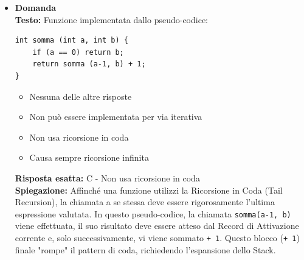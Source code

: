 \documentclass[12pt, a4paper]{article}
\newcounter{domandateoria}
\begin{document}
\begin{itemize}
    \item {}\textbf{Domanda \thedomandateoria} \\
    \textbf{Testo:} Funzione implementata dallo pseudo-codice:
\begin{verbatim}
int somma (int a, int b) {
    if (a == 0) return b;
    return somma (a-1, b) + 1;
}
\end{verbatim}
    \begin{itemize}
        \item[A)] Nessuna delle altre risposte
        \item[B)] Non può essere implementata per via iterativa
        \item[C)] Non usa ricorsione in coda
        \item[D)] Causa sempre ricorsione infinita
    \end{itemize}
    \textbf{Risposta esatta:} C - Non usa ricorsione in coda \\
    \textbf{Spiegazione:} Affinché una funzione utilizzi la Ricorsione in Coda (Tail Recursion), la chiamata a se stessa deve essere rigorosamente l'ultima espressione valutata. In questo pseudo-codice, la chiamata \texttt{somma(a-1, b)} viene effettuata, il suo risultato deve essere atteso dal Record di Attivazione corrente e, solo successivamente, vi viene sommato \texttt{+ 1}. Questo blocco (\texttt{+ 1}) finale "rompe" il pattern di coda, richiedendo l'espansione dello Stack.
    \vspace{0.3cm}


\end{itemize}
\end{document}
